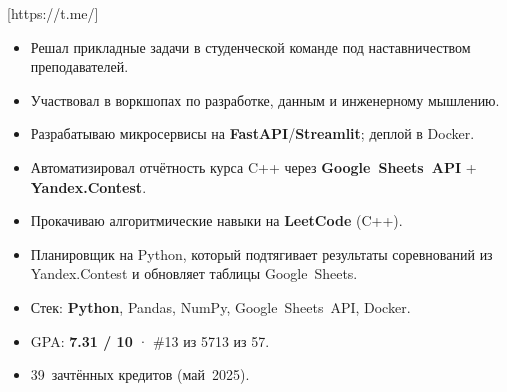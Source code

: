 \documentclass[10pt,a4paper,withhyper]{altacv}
\begin{document}
[https://t.me/]


\makecvheader

\begin{paracol}{2}


\begin{itemize}
  \item Решал прикладные задачи в студенческой команде под наставничеством преподавателей.
  \item Участвовал в воркшопах по разработке, данным и инженерному мышлению.
\end{itemize}

\divider

\begin{itemize}
  \item Разрабатываю микросервисы на \textbf{FastAPI}/\textbf{Streamlit}; деплой в Docker.
  \item Автоматизировал отчётность курса C++ через \textbf{Google Sheets API} + \textbf{Yandex.Contest}.
  \item Прокачиваю алгоритмические навыки на \textbf{LeetCode} (C++).
\end{itemize}


\begin{itemize}
  \item Планировщик на Python, который подтягивает результаты соревнований из Yandex.Contest и обновляет таблицы Google Sheets.
  \item Стек: \textbf{Python}, Pandas, NumPy, Google Sheets API, Docker.
\end{itemize}


\begin{itemize}
  \item GPA: \textbf{7.31 / 10} · \#13 из 5713 из 57.
  \item 39 зачтённых кредитов (май 2025).
\end{itemize}


\end{paracol}
\end{document}
